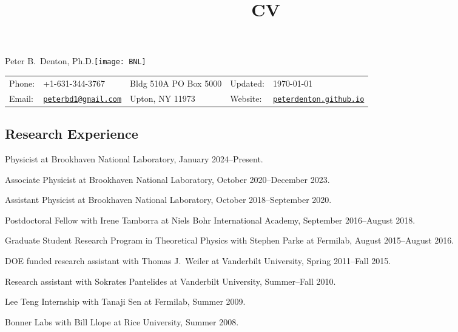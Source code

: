 \documentclass{article}
\title{CV}
\newif\ifhtlatex
\def\name{Peter B.~Denton, Ph.D.}
\renewenvironment{itemize}{
\begin{list}{}{
\setlength{\leftmargin}{.5em}}}{
\end{list}}
\begin{document}
\ifhtlatex
\Tag{TITLE+}{CV}
\fi


\vspace*{-0.5in}
{\huge \name}\hfill\texttt{[image: BNL]}\\
\vspace{0.1in}
\begin{tabular}{ll|l|ll}
Phone: & +1-631-344-3767 & Bldg 510A PO Box 5000 & Updated: & \today\\
Email: & \href{mailto:peterbd1@gmail.com}{\tt peterbd1@gmail.com} & Upton, NY 11973 & Website: & 
\href{http://peterdenton.github.io}{\tt peterdenton.github.io}
\end{tabular}

\subsection*{Research Experience}
\begin{itemize}
\item Physicist at Brookhaven National Laboratory, January 2024--Present.
\item Associate Physicist at Brookhaven National Laboratory, October 2020--December 2023.
\item Assistant Physicist at Brookhaven National Laboratory, October 2018--September 2020.
\item Postdoctoral Fellow with Irene Tamborra at Niels Bohr International Academy, September 2016--August 2018.
\item Graduate Student Research Program in Theoretical Physics with Stephen Parke at Fermilab, August 2015--August 2016.
\item DOE funded research assistant with Thomas J.~Weiler at Vanderbilt University, Spring 2011--Fall 2015.
\item Research assistant with Sokrates Pantelides at Vanderbilt University, Summer--Fall 2010.
\item Lee Teng Internship with Tanaji Sen at Fermilab, Summer 2009.
\item Bonner Labs with Bill Llope at Rice University, Summer 2008.
\end{itemize}
\end{document}
